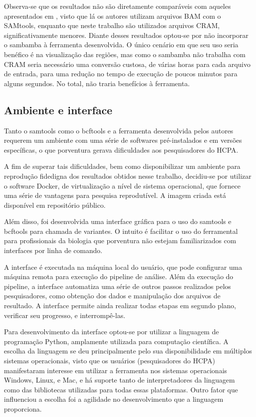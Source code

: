 \documentclass[cic,tc]{iiufrgs}
\begin{document}
Observa-se que os resultados não são diretamente comparáveis com aqueles
apresentados em \cite{tarasov2015sambamba}, visto que lá os autores utilizam
arquivos BAM com o SAMtools, enquanto que neste trabalho são utilizados
arquivos CRAM, significativamente menores. Diante desses resultados optou-se
por não incorporar o sambamba à ferramenta desenvolvida. O único cenário em que
seu uso seria benéfico é na visualização das regiões, mas como o sambamba não
trabalha com CRAM seria necessário uma conversão custosa, de várias horas para
cada arquivo de entrada, para uma redução no tempo de execução de poucos
minutos para alguns segundos. No total, não traria benefícios à ferramenta.

\subsection{Ambiente e interface}

Tanto o samtools como o bcftools e a ferramenta desenvolvida pelos autores
requerem um ambiente com uma série de softwares pré-instalados e em versões
específicas, o que porventura gerava dificuldades aos pesquisadores do HCPA.

A fim de superar tais dificuldades, bem como disponibilizar um ambiente para
reprodução fidedigna dos resultados obtidos nesse trabalho, decidiu-se por
utilizar o software Docker, de virtualização a nível de sistema operacional,
que fornece uma série de vantagens para pesquisa
reprodutível.\cite{boettiger2015introduction} A imagem criada está disponível
em repositório público.\cite{dockerme}

Além disso, foi desenvolvida uma interface gráfica para o uso do samtools e
bcftools para chamada de variantes. O intuito é facilitar o uso do ferramental
para profissionais da biologia que porventura não estejam familiarizados com
interfaces por linha de comando.

A interface é executada na máquina local do usuário, que pode configurar uma
máquina remota para execução do pipeline de análise. Além da execução do
pipeline, a interface automatiza uma série de outros passos realizados pelos
pesquisadores, como obtenção dos dados e manipulação dos arquivos de resultado.
A interface permite ainda realizar todas etapas em segundo plano, verificar seu
progresso, e interrompê-las.

Para desenvolvimento da interface optou-se por utilizar a linguagem de
programação Python, amplamente utilizada para computação
científica.\cite{oliphant2007python} A escolha da linguagem se deu
principalmente pelo sua disponibilidade em múltiplos sistemas operacionais,
visto que os usuários (pesquisadores do HCPA) manifestaram interesse em
utilizar a ferramenta nos sistemas operacionais Windows, Linux, e Mac, e há
suporte tanto de interpretadores da linguagem como das bibliotecas utilizadas
para todas essas plataformas.\cite{oliphant2007python} Outro fator que
influenciou a escolha foi a agilidade no desenvolvimento que a linguagem
proporciona.\cite{oliphant2007python}
\end{document}
